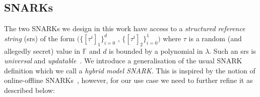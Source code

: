 \subsection{SNARKs}
\label{sec:snarks_defs}
\vspace{-0.02in}
\noindent The two SNARKs we design in this work have access to a \emph{structured reference string} (srs) of the form 
$(\{[\tau^i]_1\}_{i=0}^{d}$ , $\{[\tau^i]_2\}_{i=0}^{1})$ where $\tau$ is a random (and allegedly secret) value in $\mathbb{F}$ and $d$ 
is bounded by a polynomial in $\lambda$. Such an srs is \emph{universal} and \emph{updatable}~\cite{updatable_universal_srs_2018}. 
We introduce a generalisation of the usual SNARK definition which we call a \emph{hybrid model SNARK}. This is inspired by the notion of online-offline SNARKs~\cite{HP_paper}, 
however, for our use case we need to further refine it as described below:                                      
